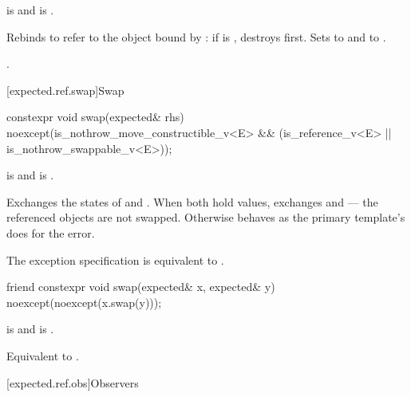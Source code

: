 \begin{itemdescr}
\pnum
\constraints
{} is  and  is .

\pnum
\effects
Rebinds  to refer to the object bound by : if  is , destroys  first. Sets  to  and  to .

\pnum
\returns
{}.
\end{itemdescr}

[expected.ref.swap]{Swap}

%
\begin{itemdecl}
constexpr void swap(expected& rhs) noexcept(is_nothrow_move_constructible_v<E> &&
                                            (is_reference_v<E> ||
                                             is_nothrow_swappable_v<E>));
\end{itemdecl}

\begin{itemdescr}
\pnum
\constraints
{} is  and  is .

\pnum
\effects
Exchanges the states of  and . When both hold values, exchanges  and  — the referenced objects are not swapped. Otherwise behaves as the primary template's  does for the error.

\pnum
\remarks
The exception specification is equivalent to .
\end{itemdescr}

%
\begin{itemdecl}
friend constexpr void swap(expected& x, expected& y) noexcept(noexcept(x.swap(y)));
\end{itemdecl}

\begin{itemdescr}
\pnum
\constraints
{} is  and  is .

\pnum
\effects
Equivalent to .
\end{itemdescr}

[expected.ref.obs]{Observers}

